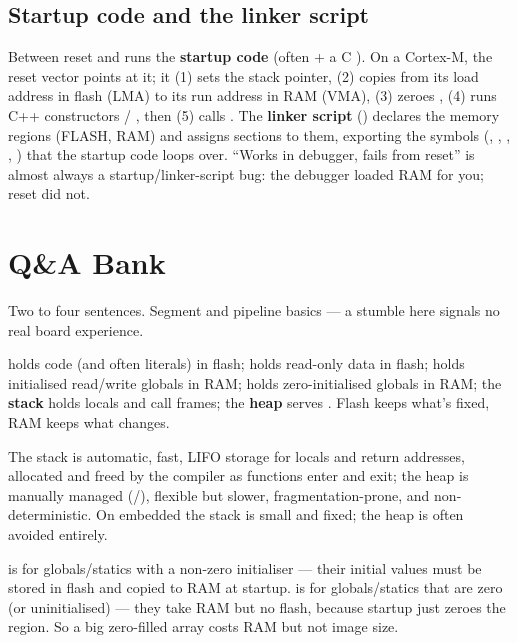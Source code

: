 \subsection{Startup code and the linker script}

Between reset and  runs the \textbf{startup code} (often
 + a C ). On a Cortex-M, the reset vector
points at it; it (1) sets the stack pointer, (2) copies  from its
load address in flash (LMA) to its run address in RAM (VMA), (3) zeroes
, (4) runs C++ constructors / , then (5) calls
. The \textbf{linker script} () declares the memory
regions (FLASH, RAM) and assigns sections to them, exporting the symbols
(, , , , )
that the startup code loops over. ``Works in debugger, fails from reset'' is
almost always a startup/linker-script bug: the debugger loaded RAM for you;
reset did not.

\section{Q\&A Bank}

%
{Two to four sentences. Segment and pipeline basics --- a stumble here signals
no real board experience.}

 holds code (and often literals) in flash;  holds
 read-only data in flash;  holds initialised
read/write globals in RAM;  holds zero-initialised globals in RAM;
the \textbf{stack} holds locals and call frames; the \textbf{heap} serves
. Flash keeps what's fixed, RAM keeps what changes.

The stack is automatic, fast, LIFO storage for locals and return addresses,
allocated and freed by the compiler as functions enter and exit; the heap is
manually managed (/), flexible but slower,
fragmentation-prone, and non-deterministic. On embedded the stack is small and
fixed; the heap is often avoided entirely.

 is for globals/statics with a non-zero initialiser --- their
initial values must be stored in flash and copied to RAM at startup.
 is for globals/statics that are zero (or uninitialised) --- they
take RAM but no flash, because startup just zeroes the region. So a big
zero-filled array costs RAM but not image size.

